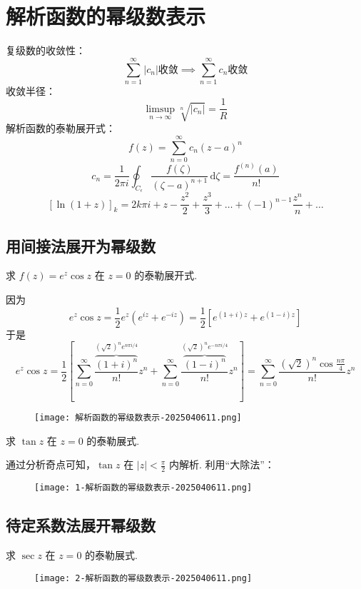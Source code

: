\section{解析函数的幂级数表示}

复级数的收敛性：
\[
\sum_{n=1}^{\infty} \lvert c _n \rvert \text{收敛}\implies \sum_{n=1}^{\infty} c _n\text{收敛}
\]
收敛半径：
\[
\limsup_{ n \to \infty } \sqrt[n]{ \lvert c_n \rvert  }=\frac{1}{R}
\]
解析函数的泰勒展开式：
\[
f(z)=\sum_{n=0}^{\infty} c_n(z-a)^{n}
\]
\[
c_n=\frac{1}{2\pi i}\oint_{C_{\epsilon}} \frac{f(\zeta)}{(\zeta-a)^{n+1}} \, \mathrm{d}\zeta=\frac{f^{(n)}(a)}{n!}
\]
\[
[\ln(1+z)]_{k}=2k\pi i+z-\frac{z^2}{2}+\frac{z^{3}}{3}+\dots+(-1)^{n-1}\frac{z^{n}}{n}+\dots
\]
\subsection{用间接法展开为幂级数}

\begin{exercise}
求 $f(z)=e^{ z }\cos z$ 在 $z=0$ 的泰勒展开式.
\end{exercise}
因为
\[
e^{ z }\cos z=\frac{1}{2}e^{ z }(e^{ iz }+e^{ -iz })=\frac{1}{2}[e^{ (1+i)z }+e^{ (1-i)z }]
\]
于是
\[
e^{ z }\cos z=\frac{1}{2}\left[ \sum_{n=0}^{\infty} \frac{\overbrace{ (1+i)^{n} }^{ (\sqrt{ 2 })^{n}e^{ n\pi i/4 } }}{n!}z^{n}+\sum_{n=0}^{\infty} \frac{\overbrace{ (1-i)^{n} }^{ (\sqrt{ 2 })^{n}e^{ -n\pi i/4 } }}{n!}z^{n} \right]=\sum_{n=0}^{\infty} \frac{(\sqrt{ 2 })^{n}\cos\frac{n\pi }{4}}{n!}z^{n}
\]
\begin{figure}[H]
\centering
\texttt{[image: 解析函数的幂级数表示-2025040611.png]}
\label{}
\end{figure}

\begin{exercise}
求 $\tan z$ 在 $z=0$ 的泰勒展式.
\end{exercise}
通过分析奇点可知，$\tan z$ 在 $\lvert z \rvert<\frac{\pi}{2}$ 内解析. 利用“大除法”：

\begin{figure}[H]
\centering
\texttt{[image: 1-解析函数的幂级数表示-2025040611.png]}
\label{}
\end{figure}

\subsection{待定系数法展开幂级数}

\begin{exercise}
求 $\sec z$ 在 $z=0$ 的泰勒展式.
\end{exercise}
\begin{figure}[H]
\centering
\texttt{[image: 2-解析函数的幂级数表示-2025040611.png]}
\label{}
\end{figure}

